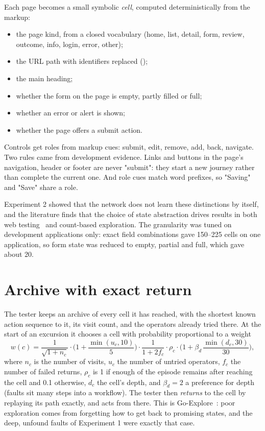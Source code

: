 Each page becomes a small symbolic \emph{cell}, computed deterministically from the markup:

\begin{itemize}[noitemsep]
  \item the page kind, from a closed vocabulary (home, list, detail, form, review, outcome,
        info, login, error, other);
  \item the URL path with identifiers replaced ();
  \item the main heading;
  \item whether the form on the page is empty, partly filled or full;
  \item whether an error or alert is shown;
  \item whether the page offers a submit action.
\end{itemize}

Controls get roles from markup cues: submit, edit, remove, add, back, navigate. Two rules
came from development evidence. Links and buttons in the page's navigation, header or
footer are never "submit": they start a new journey rather than complete the current one.
And role cues match word prefixes, so "Saving" and "Save" share a role.

Experiment 2 showed that the network does not learn these distinctions by itself, and the
literature finds that the choice of state abstraction drives results in both web
testing~\cite{liu2026webgui} and count-based
exploration. The granularity was tuned on development
applications only: exact field combinations gave 150--225 cells on one application, so form
state was reduced to empty, partial and full, which gave about 20.

\section{Archive with exact return}
\label{sec:archive}

The tester keeps an archive of every cell it has reached, with the shortest known action
sequence to it, its visit count, and the operators already tried there. At the start of an
excursion it chooses a cell with probability proportional to a weight
\begin{equation}
  w(c) = \frac{1}{\sqrt{1 + n_c}}\cdot\Big(1 + \frac{\min(u_c, 10)}{5}\Big)\cdot
         \frac{1}{1 + 2 f_c}\cdot \rho_c \cdot \Big(1 + \beta_d\,\frac{\min(d_c, 30)}{30}\Big),
\end{equation}
where $n_c$ is the number of visits, $u_c$ the number of untried operators, $f_c$ the
number of failed returns, $\rho_c$ is 1 if enough of the episode remains after reaching the
cell and 0.1 otherwise, $d_c$ the cell's depth, and $\beta_d = 2$ a preference for depth
(faults sit many steps into a workflow). The tester then \emph{returns} to the cell by
replaying its path exactly, and acts from there. This is
Go-Explore~\cite{ecoffet2021first}: poor exploration comes from forgetting how to get back to
promising states, and the deep, unfound faults of Experiment 1 were exactly that case.

